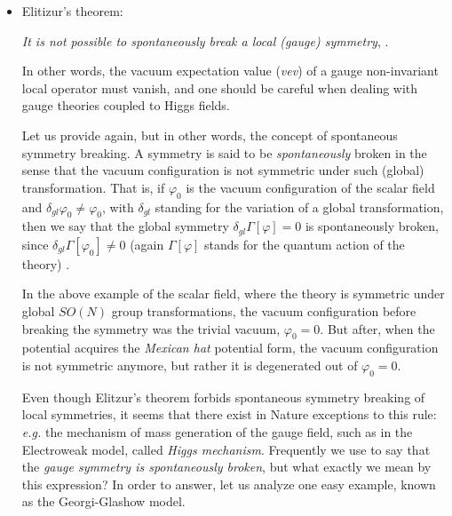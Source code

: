 \begin{itemize}
\item Elitizur's theorem:

\emph{It is not possible to spontaneously break a local (gauge) symmetry},
\cite{Elitzur:1975im}.

In other words, the vacuum expectation value (\emph{vev}) of a gauge non-invariant local
operator must vanish, and one should be careful when dealing with gauge theories coupled to
Higgs fields.

Let us provide again, but in other words, the concept of spontaneous symmetry breaking. A
symmetry is said to be \emph{spontaneously} broken in the sense that the vacuum configuration
is not symmetric under such (global) transformation. That is, if $\varphi_{0}$ is the vacuum
configuration of the scalar field and $\delta_{gl}\varphi_{0} \neq \varphi_{0}$, with
$\delta_{gl}$ standing for the variation of a global transformation, then we say that the global symmetry
$\delta_{gl} \Gamma[\varphi]=0$ is spontaneously broken, since $\delta_{gl}\Gamma[\varphi_{0}]
\neq 0$ (again $\Gamma[\varphi]$ stands for the quantum action of the theory)
\cite{Weinberg:1996kr,Peskin:1995ev,Ryder:1985wq}.

In the above example of the scalar field, where the theory is symmetric under global $SO(N)$
group transformations, the vacuum configuration before breaking the symmetry was the trivial
vacuum, $\varphi_{0} =0$. But after, when the potential acquires the \emph{Mexican hat}
potential form, the vacuum configuration is not symmetric anymore, but rather it is degenerated
out of $\varphi_{0} =0$.

Even though Elitzur's theorem forbids spontaneous symmetry breaking of local symmetries, it
seems that there exist in Nature exceptions to this rule: \emph{e.g.} the mechanism of mass
generation of the gauge field, such as in the Electroweak model, called {\it Higgs mechanism}.
Frequently we use to say that the \emph{gauge symmetry is spontaneously broken}, but what
exactly we mean by this expression? In order to answer, let us analyze one easy example, known
as the Georgi-Glashow model.


\end{itemize}
